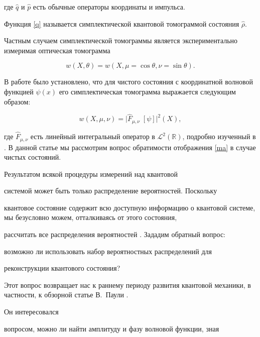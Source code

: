 где $\hat q$ и $\hat p$ есть обычные операторы координаты и импульса. 

Функция \eqref{q} называется симплектической квантовой томограммой состояния $\hat\rho$. 

Частным случаем симплектической томограммы является экспериментально измеримая \cite{raymer} оптическая томограмма

$$w(X,\theta)=w(X,\mu=\cos\theta,\nu=\sin\theta).$$







В работе \cite{manko} было установлено, что для чистого состояния с координатной волновой функцией $\psi(x)$ его симплектическая томограмма выражается следующим образом:

\begin{equation}\label{ma}

w(X,\mu,\nu)=\big|\hat F_{\mu,\nu}\; [\psi]\big|^2(X),

\end{equation}

где $\hat F_{\mu,\nu}$ есть линейный интегральный оператор в $\mathcal{L}^2(\mathbb{R})$, подробно изученный в \cite{dn}. В данной статье мы рассмотрим вопрос обратимости отображения \eqref{ma} в случае чистых состояний.



\smallskip




Результатом всякой процедуры измерений над квантовой

системой может быть только распределение вероятностей. Поскольку

квантовое состояние содержит всю доступную информацию о квантовой системе, мы безусловно можем, отталкиваясь от этого состояния,

рассчитать все распределения вероятностей \cite{slyah}. Зададим обратный вопрос:

возможно ли использовать набор вероятностных распределений для

реконструкции квантового состояния?



Этот вопрос возвращает нас к раннему периоду развития квантовой механики, в частности, к обзорной статье В.~Паули \cite{pauli1}. 

Он интересовался

вопросом, можно ли найти амплитуду и фазу волновой функции, зная


